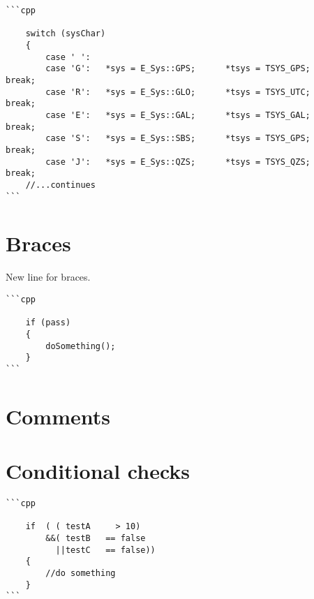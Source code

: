 \begin{verbatim}
```cpp

    switch (sysChar)
    {
        case ' ':
        case 'G':   *sys = E_Sys::GPS;      *tsys = TSYS_GPS;    break;
        case 'R':   *sys = E_Sys::GLO;      *tsys = TSYS_UTC;    break;
        case 'E':   *sys = E_Sys::GAL;      *tsys = TSYS_GAL;    break;
        case 'S':   *sys = E_Sys::SBS;      *tsys = TSYS_GPS;    break;
        case 'J':   *sys = E_Sys::QZS;      *tsys = TSYS_QZS;    break;
    //...continues
```
\end{verbatim}

\section{Braces}

New line for braces.
\begin{verbatim}
```cpp

    if (pass)
    {
        doSomething();
    }
```
\end{verbatim}

\section{Comments}


\section{Conditional checks}
\begin{verbatim}
```cpp

    if  ( ( testA     > 10)
        &&( testB   == false
          ||testC   == false))
    {
        //do something
    }
```
\end{verbatim}

